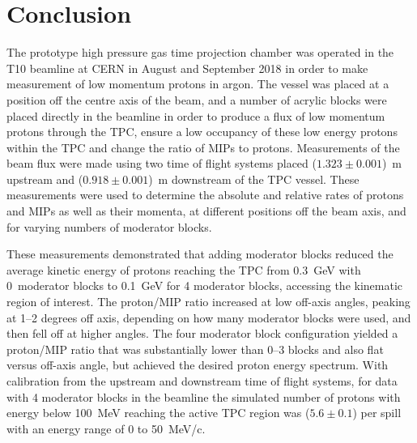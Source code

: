 \section{Conclusion}
\label{hptpcPaper:sec:Conclusion}

The prototype high pressure gas time projection chamber was operated in the T10 beamline at CERN in August and September 2018 in order to make measurement of low momentum protons in argon.
The vessel was placed at a position off the centre axis of the beam, and a number of acrylic blocks were placed directly in the beamline in order to produce a flux of low momentum protons through the TPC, ensure a low occupancy of these low energy protons within the TPC and change the ratio of MIPs to protons.
Measurements of the beam flux were made using two time of flight systems placed ($1.323 \pm 0.001$)~m upstream and ($0.918 \pm 0.001$)~m downstream of the TPC vessel.
These measurements were used to determine the absolute and relative rates of protons and MIPs as well as their momenta, at different positions off the beam axis, and for varying numbers of moderator blocks.

These measurements demonstrated that adding moderator blocks reduced the average kinetic energy of protons reaching the TPC from 0.3~GeV with 0~moderator blocks to 0.1~GeV for 4 moderator blocks, accessing the kinematic region of interest.
The proton/MIP ratio increased at low off-axis angles, peaking at 1–2 degrees off axis, depending on how many moderator blocks were used, and then fell off at higher angles.
The four moderator block configuration yielded a proton/MIP ratio that was  substantially lower than 0–3 blocks and also flat versus off-axis angle, but achieved the desired proton energy spectrum.
With calibration from the upstream and downstream time of flight systems, for data with 4 moderator blocks in the beamline the simulated number of protons with energy below 100~MeV reaching the active TPC region was ($5.6 \pm  0.1$) per spill with an energy range of 0 to 50~MeV/c.


